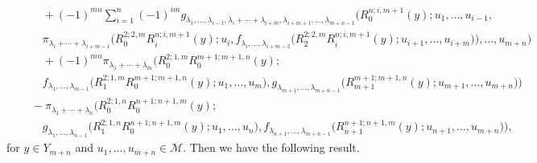\documentclass[a4paper,reqno,10pt]{amsart}
\theoremstyle{plain}
\theoremstyle{definition}
\theoremstyle{remark}
\newcommand{\M}{\mathcal{M}}
\newcommand{\p}{\partial}
\newcommand{\la}{\lambda}
\begin{document}
\begin{align}
& \quad \quad +(-1)^{m n} \sum_{i=1}^{n}(-1)^{i m} g_{\la_{1}, \ldots , \la_{i-1},\la_{i}+\cdots+\la_{i+m},\la_{i+m+1}, \ldots ,\la_{m+n-1}} \big(R_{0}^{n ; i, m+1}(y) ; u_{1}, \ldots, u_{i-1}, \nonumber \\
& \quad \quad  \pi_{\la_{i}+\cdots+\la_{i+m-1}} \big(R_{0}^{2 ; 2, m} R_{i}^{n ; i, m+1}(y) ; u_{i}, f_{\la_{i},\ldots,\la_{i+m-2}}\big(R_{2}^{2 ; 2, m} R_{i}^{n ; i, m+1}(y) ; u_{i+1}, \ldots, u_{i+m}\big)\big), \ldots, u_{m+n} \big)  \nonumber \\
&\quad \quad +(-1)^{m n} \pi_{\la_{1}+\cdots+\la_{m}} \big(R_{0}^{2 ; 1, m} R_{0}^{m+1 ; m+1, n}(y) ; \nonumber \\
& \quad \quad  f_{\la_{1},\ldots,\la_{m-1}} \big(R_{1}^{2 ; 1, m} R_{0}^{m+1 ; m+1, n}(y) ;u_{1}, \ldots, u_{m}\big), g_{\la_{m+1},\ldots,\la_{m+n-1}}\big(R_{m+1}^{m+1 ; m+1, n}(y) ; u_{m+1}, \ldots, u_{m+n}\big) \big) \nonumber \\
& \quad -\pi_{\la_{1}+\cdots+\la_{n}}\big(R_{0}^{2 ; 1, n} R_{0}^{n+1 ; n+1, m}(y) ; \nonumber \\
& \quad \quad  g_{\la_{1},\dots,\la_{n-1}} \big(R_{1}^{2 ; 1, n} R_{0}^{n+1 ; n+1, m}(y) ; u_{1}, \ldots, u_{n}\big), f_{\la_{n+1}, \ldots, \la_{m+n-1}} \big(R_{n+1}^{n+1 ; n+1, m}(y) ; u_{n+1}, \ldots, u_{m+n}\big) \big), 
\end{align}
for $y \in Y_{m+n}$ and $u_{1}, \ldots, u_{m+n} \in \M$.
Then we have the following result.
\end{document}
